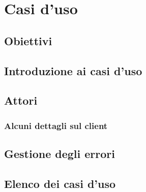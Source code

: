 \section{Casi d'uso}
\subsection{Obiettivi}
\subsection{Introduzione ai casi d'uso}
\subsection{Attori}
\subsubsection{Alcuni dettagli sul client}
\subsection{Gestione degli errori}
\subsection{Elenco dei casi d'uso}